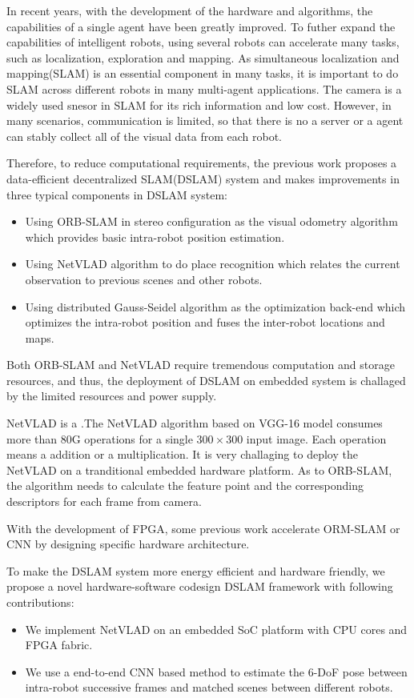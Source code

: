 \label{sec:introdutction}
In recent years, with the development of the hardware and algorithms, the capabilities of a single agent have been greatly improved.
To futher expand the capabilities of intelligent robots, using several robots can accelerate many tasks, such as localization, exploration and mapping.
As simultaneous localization and mapping(SLAM) is an essential component in many tasks, it is important to do SLAM across different robots in many multi-agent applications. 
The camera is a widely used snesor in SLAM for its rich information and low cost. 
However, in many scenarios, communication is limited, so that there is no a server or a agent can stably collect all of the visual data from each robot.

Therefore, to reduce computational requirements, the previous work \cite{Cieslewski:20187ee} proposes a data-efficient decentralized SLAM(DSLAM) system and makes improvements in three typical components in DSLAM system:
\begin{itemize}
\item Using ORB-SLAM \cite{orbslam} in stereo configuration as the visual odometry algorithm which provides basic intra-robot position estimation.
\item Using NetVLAD \cite{Arandjelovic:2017997} algorithm to do place recognition which relates the current observation to previous scenes and other robots.
\item Using distributed Gauss-Seidel algorithm \cite{parallel_distributed} as the optimization back-end which optimizes the intra-robot position and fuses the inter-robot locations and maps.
\end{itemize}

Both ORB-SLAM and NetVLAD require tremendous computation and storage resources, and thus, the deployment of DSLAM on embedded system is challaged by the limited resources and power supply.

NetVLAD is a  .The NetVLAD algorithm based on VGG-16 model \cite{vgg16} consumes more than 80G operations for a single $300 \times 300$ input image. Each operation means a addition or a multiplication. It is very challaging to deploy the NetVLAD on a tranditional embedded hardware platform. 
As to ORB-SLAM, the algorithm needs to calculate the feature point and the corresponding descriptors for each frame from camera.

With the development of FPGA, some previous work accelerate ORM-SLAM or CNN by designing specific hardware architecture. %

To make the DSLAM system more energy efficient and hardware friendly, we propose a novel hardware-software codesign DSLAM framework with following contributions:
\begin{itemize}
\item We implement NetVLAD on an embedded SoC platform with CPU cores and FPGA fabric.
\item We use a end-to-end CNN based method to estimate the 6-DoF pose between intra-robot successive frames and matched scenes between different robots.
\end{itemize}